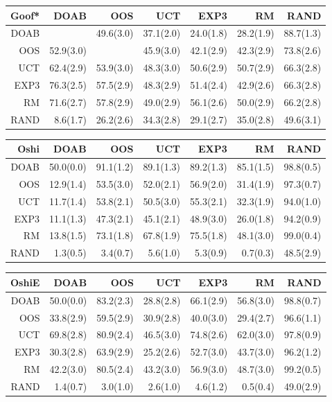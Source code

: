 \begin{figure}
\centering
\begin{scriptsize}
\begin{tabular}{|r|rrrrrr|}\hline
Goof*&DOAB&OOS&UCT&EXP3&RM&RAND\\\hline
DOAB&&49.6(3.0)&37.1(2.0)&24.0(1.8)&28.2(1.9)&88.7(1.3)\\
OOS&52.9(3.0)&&45.9(3.0)&42.1(2.9)&42.3(2.9)&73.8(2.6)\\
UCT&62.4(2.9)&53.9(3.0)&48.3(3.0)&50.6(2.9)&50.7(2.9)&66.3(2.8)\\
EXP3&76.3(2.5)&57.5(2.9)&48.3(2.9)&51.4(2.4)&42.9(2.6)&66.3(2.8)\\
RM&71.6(2.7)&57.8(2.9)&49.0(2.9)&56.1(2.6)&50.0(2.9)&66.2(2.8)\\
RAND&8.6(1.7)&26.2(2.6)&34.3(2.8)&29.1(2.7)&35.0(2.8)&49.6(3.1)\\
\hline
\end{tabular}
\begin{tabular}{|r|rrrrrr|}\hline
Oshi&DOAB&OOS&UCT&EXP3&RM&RAND\\\hline
DOAB&50.0(0.0)&91.1(1.2)&89.1(1.3)&89.2(1.3)&85.1(1.5)&98.8(0.5)\\
OOS&12.9(1.4)&53.5(3.0)&52.0(2.1)&56.9(2.0)&31.4(1.9)&97.3(0.7)\\
UCT&11.7(1.4)&53.8(2.1)&50.5(3.0)&55.3(2.1)&32.3(1.9)&94.0(1.0)\\
EXP3&11.1(1.3)&47.3(2.1)&45.1(2.1)&48.9(3.0)&26.0(1.8)&94.2(0.9)\\
RM&13.8(1.5)&73.1(1.8)&67.8(1.9)&75.5(1.8)&48.1(3.0)&99.0(0.4)\\
RAND&1.3(0.5)&3.4(0.7)&5.6(1.0)&5.3(0.9)&0.7(0.3)&48.5(2.9)\\
\hline
\end{tabular}
\begin{tabular}{|r|rrrrrr|}\hline
OshiE&DOAB&OOS&UCT&EXP3&RM&RAND\\\hline
DOAB&50.0(0.0)&83.2(2.3)&28.8(2.8)&66.1(2.9)&56.8(3.0)&98.8(0.7)\\
OOS&33.8(2.9)&59.5(2.9)&30.9(2.8)&40.0(3.0)&29.4(2.7)&96.6(1.1)\\
UCT&69.8(2.8)&80.9(2.4)&46.5(3.0)&74.8(2.6)&62.0(3.0)&97.8(0.9)\\
EXP3&30.3(2.8)&63.9(2.9)&25.2(2.6)&52.7(3.0)&43.7(3.0)&96.2(1.2)\\
RM&42.2(3.0)&80.5(2.4)&43.2(3.0)&56.9(3.0)&48.7(3.0)&99.2(0.5)\\
RAND&1.4(0.7)&3.0(1.0)&2.6(1.0)&4.6(1.2)&0.5(0.4)&49.0(2.9)\\
\hline

\end{tabular}
\end{scriptsize}
\end{figure}
